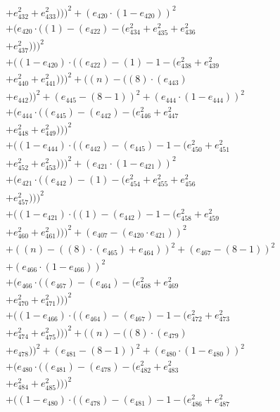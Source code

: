 \documentclass[10pt, a4paper]{article}
\begin{document}
\begin{small}
\begin{align*}
& + e_{432}^{2} + e_{433}^{2})))^{2} + (e_{420}  \cdot  (1 - e_{420}))^{2} \\
& + (e_{420}  \cdot  ((1) - (e_{422}) - (e_{434}^{2} + e_{435}^{2} + e_{436}^{2} \\
& + e_{437}^{2})))^{2} \\
& + ((1 - e_{420})  \cdot  ((e_{422}) - (1) - 1 - (e_{438}^{2} + e_{439}^{2} \\
& + e_{440}^{2} + e_{441}^{2})))^{2} + ((n) - ((8)  \cdot  (e_{443}) \\
& + e_{442}))^{2} + (e_{445} - (8 - 1))^{2} + (e_{444}  \cdot  (1 - e_{444}))^{2} \\
& + (e_{444}  \cdot  ((e_{445}) - (e_{442}) - (e_{446}^{2} + e_{447}^{2} \\
& + e_{448}^{2} + e_{449}^{2})))^{2} \\
& + ((1 - e_{444})  \cdot  ((e_{442}) - (e_{445}) - 1 - (e_{450}^{2} + e_{451}^{2} \\
& + e_{452}^{2} + e_{453}^{2})))^{2} + (e_{421}  \cdot  (1 - e_{421}))^{2} \\
& + (e_{421}  \cdot  ((e_{442}) - (1) - (e_{454}^{2} + e_{455}^{2} + e_{456}^{2} \\
& + e_{457}^{2})))^{2} \\
& + ((1 - e_{421})  \cdot  ((1) - (e_{442}) - 1 - (e_{458}^{2} + e_{459}^{2} \\
& + e_{460}^{2} + e_{461}^{2})))^{2} + (e_{407} - (e_{420}  \cdot  e_{421}))^{2} \\
& + ((n) - ((8)  \cdot  (e_{465}) + e_{464}))^{2} + (e_{467} - (8 - 1))^{2} \\
& + (e_{466}  \cdot  (1 - e_{466}))^{2} \\
& + (e_{466}  \cdot  ((e_{467}) - (e_{464}) - (e_{468}^{2} + e_{469}^{2} \\
& + e_{470}^{2} + e_{471}^{2})))^{2} \\
& + ((1 - e_{466})  \cdot  ((e_{464}) - (e_{467}) - 1 - (e_{472}^{2} + e_{473}^{2} \\
& + e_{474}^{2} + e_{475}^{2})))^{2} + ((n) - ((8)  \cdot  (e_{479}) \\
& + e_{478}))^{2} + (e_{481} - (8 - 1))^{2} + (e_{480}  \cdot  (1 - e_{480}))^{2} \\
& + (e_{480}  \cdot  ((e_{481}) - (e_{478}) - (e_{482}^{2} + e_{483}^{2} \\
& + e_{484}^{2} + e_{485}^{2})))^{2} \\
& + ((1 - e_{480})  \cdot  ((e_{478}) - (e_{481}) - 1 - (e_{486}^{2} + e_{487}^{2} \\

\end{align*}
\end{small}
\end{document}
